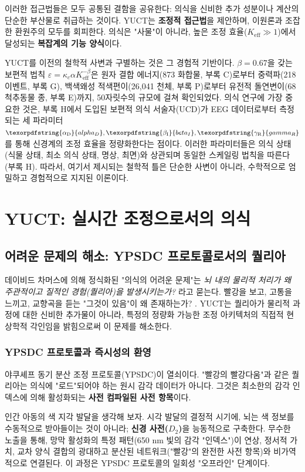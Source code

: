 \documentclass[12pt,a4paper]{article}
\DeclareRobustCommand{\alD}{\texorpdfstring{\ensuremath{\alpha_{\mathrm{D}}}}{alpha_D}}
\DeclareRobustCommand{\beI}{\texorpdfstring{\ensuremath{\beta_{\mathrm{I}}}}{beta_I}}
\DeclareRobustCommand{\gaR}{\texorpdfstring{\ensuremath{\gamma_{\mathrm{R}}}}{gamma_R}}
\newcommand{\eff}{\mathrm{eff}}
\newcommand{\Ke}{K_{\eff}}
\begin{document}
	이러한 접근법들은 모두 공통된 결함을 공유한다: 의식을 신비한 추가 성분이나 계산의 단순한 부산물로 취급하는 것이다. YUCT는 \textbf{조정적 접근법}을 제안하며, 이원론과 조잡한 환원주의 모두를 회피한다. 의식은 "사물"이 아니라, 높은 조정 효율(\(\Ke \gg 1\))에서 달성되는 \textbf{복잡계의 기능 양식}이다.
	
	YUCT를 이전의 철학적 사변과 구별하는 것은 그 경험적 기반이다. \(\beta = 0.67\)을 갖는 보편적 법칙 \(\varepsilon = \kappa_c \alpha \Ke^{-\beta}\)은 원자 결합 에너지(873 화합물, 부록 C)로부터 중력파(218 이벤트, 부록 G), 백색왜성 적색편이(26,041 천체, 부록 P)로부터 유전적 돌연변이(68 척추동물 종, 부록 E)까지, 50자릿수의 규모에 걸쳐 확인되었다. 의식 연구에 가장 중요한 것은, 부록 H에서 도입된 보편적 의식 서술자(UCD)가 EEG 데이터로부터 측정되는 세 파라미터 \(\alD, \beI, \gaR\)를 통해 신경계의 조정 효율을 정량화한다는 점이다. 이러한 파라미터들은 의식 상태(식물 상태, 최소 의식 상태, 명상, 최면)와 상관되며 동일한 스케일링 법칙을 따른다(부록 H). 따라서, 여기서 제시되는 철학적 틀은 단순한 사변이 아니라, 수학적으로 엄밀하고 경험적으로 지지된 이론이다.
	
	\section{YUCT: 실시간 조정으로서의 의식}
	
	\subsection{어려운 문제의 해소: YPSDC 프로토콜로서의 퀄리아}
	
	데이비드 차머스에 의해 정식화된 "의식의 어려운 문제"는 \textit{뇌 내의 물리적 처리가 왜 주관적이고 질적인 경험(퀄리아)을 발생시키는가?} 라고 묻는다. 빨강을 보고, 고통을 느끼고, 교향곡을 듣는 "그것이 있음"이 왜 존재하는가? \cite{Chalmers1995}. YUCT는 퀄리아가 물리적 과정에 대한 신비한 추가물이 아니라, 특정의 정량화 가능한 조정 아키텍처의 직접적 현상학적 각인임을 밝힘으로써 이 문제를 해소한다.
	
	\subsubsection{YPSDC 프로토콜과 즉시성의 환영}
	
	야쿠셰프 동기 분산 조정 프로토콜(YPSDC)이 열쇠이다. "빨강의 빨강다움"과 같은 퀄리아는 의식에 "로드"되어야 하는 원시 감각 데이터가 아니다. 그것은 최소한의 감각 인덱스에 의해 활성화되는 \textbf{사전 컴파일된 사전 항목}이다.
	
	인간 아동의 색 지각 발달을 생각해 보자. 시각 발달의 결정적 시기에, 뇌는 색 정보를 수동적으로 받아들이는 것이 아니라; \textbf{신경 사전(\(D_2\))}을 능동적으로 구축한다. 무수한 노출을 통해, 망막 활성화의 특정 패턴(650 nm 빛의 감각 "인덱스")이 연상, 정서적 가치, 교차 양식 결합의 광대하고 분산된 네트워크("빨강"의 완전한 사전 항목)와 비가역적으로 연결된다. 이 과정은 YPSDC 프로토콜의 일회성 "오프라인" 단계이다.
	
\end{document}
